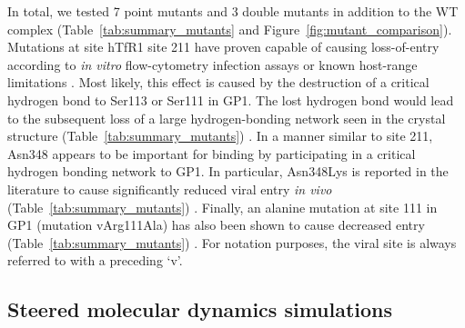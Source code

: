 \documentclass[12pt]{article} %
\providecommand{\DIFaddbegin}{} %
\providecommand{\DIFaddend}{} %
\providecommand{\DIFdelbegin}{} %
\providecommand{\DIFdelend}{} %
\begin{document}
In total, we tested 7 point mutants and 3 double mutants in addition to the WT complex (Table~\ref{tab:summary_mutants} and Figure~\ref{fig:mutant_comparison}). Mutations at site hTfR1 site 211 have proven capable of causing loss-of-entry according to \textit{in vitro} flow-cytometry infection assays or known host-range limitations \DIFdelbegin %
\DIFdelend \DIFaddbegin \citep{Rad2008,Rad20111,Rad20112}\DIFaddend . Most likely, this effect is caused by the destruction of a critical hydrogen bond to Ser113 or Ser111 in GP1. The lost hydrogen bond would lead to the subsequent loss of a large hydrogen-bonding network seen in the crystal structure (Table~\ref{tab:summary_mutants}) \DIFdelbegin %
\DIFdelend \DIFaddbegin \citep{Abraham2010}\DIFaddend . In a manner similar to site 211, Asn348 appears to be important for binding by participating in a critical hydrogen bonding network \DIFdelbegin %
\DIFdelend \DIFaddbegin \citep{Rad2008,Abraham2010} \DIFaddend to GP1. In particular, Asn348Lys is reported in the literature to cause significantly reduced viral entry \textit{in vivo} (Table~\ref{tab:summary_mutants}) \DIFdelbegin %
\DIFdelend \DIFaddbegin \citep{Rad2008,Abraham2010}\DIFaddend . Finally, an alanine mutation at site 111 in GP1 (mutation vArg111Ala) has also been shown to cause decreased entry (Table~\ref{tab:summary_mutants}) \DIFdelbegin %
\DIFdelend \DIFaddbegin \citep{Rad20112}\DIFaddend . For notation purposes, the viral site is always referred to with a preceding `v'.  

\subsection{Steered molecular dynamics simulations}
\end{document}
